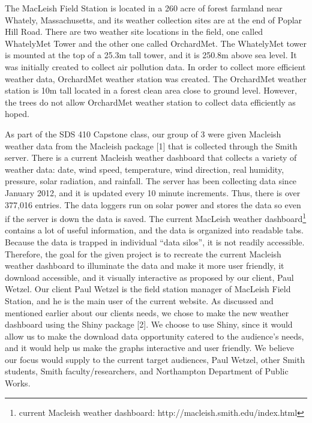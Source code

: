 \documentclass[10pt,letterpaper]{article}
\begin{document}
The MacLeish Field Station is located in a 260 acre of forest farmland
near Whately, Massachusetts, and its weather collection sites are at the
end of Poplar Hill Road. There are two weather site locations in the
field, one called WhatelyMet Tower and the other one called OrchardMet.
The WhatelyMet tower is mounted at the top of a 25.3m tall tower, and it
is 250.8m above sea level. It was initially created to collect air
pollution data. In order to collect more efficient weather data,
OrchardMet weather station was created. The OrchardMet weather station
is 10m tall located in a forest clean area close to ground level.
However, the trees do not allow OrchardMet weather station to collect
data efficiently as hoped.

As part of the SDS 410 Capstone class, our group of 3 were given
Macleish weather data from the Macleish package {[}1{]} that is
collected through the Smith server. There is a current Macleish weather
dashboard that collects a variety of weather data: date, wind speed,
temperature, wind direction, real humidity, pressure, solar radiation,
and rainfall. The server has been collecting data since January 2012,
and it is updated every 10 minute increments. Thus, there is over
377,016 entries. The data loggers run on solar power and stores the data
so even if the server is down the data is saved. The current MacLeish
weather dashboard\footnote{current Macleish weather dashboard:
  http://macleish.smith.edu/index.html} contains a lot of useful
information, and the data is organized into readable tabs. Because the
data is trapped in individual ``data silos'', it is not readily
accessible. Therefore, the goal for the given project is to recreate the
current Macleish weather dashboard to illuminate the data and make it
more user friendly, it download accessible, and it visually interactive
as proposed by our client, Paul Wetzel. Our client Paul Wetzel is the
field station manager of MacLeish Field Station, and he is the main user
of the current website. As discussed and mentioned earlier about our
clients needs, we chose to make the new weather dashboard using the
Shiny package {[}2{]}. We choose to use Shiny, since it would allow us
to make the download data opportunity catered to the audience's needs,
and it would help us make the graphs interactive and user friendly. We
believe our focus would supply to the current target audiences, Paul
Wetzel, other Smith students, Smith faculty/researchers, and Northampton
Department of Public Works.
\end{document}
